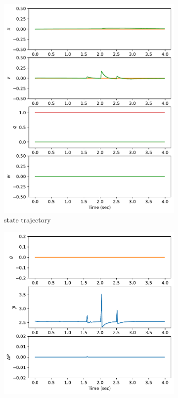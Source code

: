 \documentclass[]{article}
\begin{document}
\begin{figure}[H]
	\centering
	\begin{subfigure}[b]{0.3\textwidth}
		\centering
		\includegraphics[width=\textwidth]{figures/cpsState.pdf}
		\caption{state trajectory}
	\end{subfigure}
	\begin{subfigure}[b]{0.3\textwidth}
		\centering
		\includegraphics[width=\textwidth]{figures/cpsControl.pdf}

\end{subfigure}
\end{figure}
\end{document}
